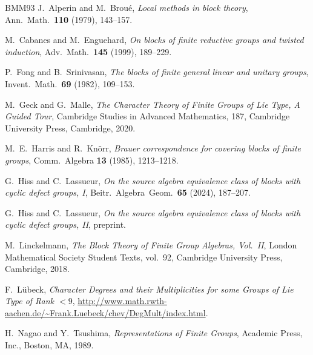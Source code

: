\documentclass[12pt]{amsart}
\theoremstyle{theorem}
\theoremstyle{definition}
\theoremstyle{remark}
\begin{document}
\begin{thebibliography}{BMM93}
 J.~Alperin and M.~Brou{\'e}, \emph{Local methods in 
        block theory}, Ann.\ Math.\ \textbf{110} (1979), 143--157.

 M.~Cabanes and M.~Enguehard, \emph{On blocks of finite 
        reductive groups and twisted induction}, Adv.\ Math.\ \textbf{145} 
        (1999), 189--229. 

 P.~Fong and B.~Srinivasan, \emph{The blocks of finite 
        general linear and unitary groups}, Invent.\ Math.\ \textbf{69} 
        (1982), 109--153.

 M.~Geck and G.~Malle, \emph{The Character Theory of 
        Finite Groups of Lie Type, A Guided Tour}, Cambridge Studies in Advanced
        Mathematics, 187, Cambridge University Press, Cambridge, 2020.

 M.~E.~Harris and R.~Kn{\"o}rr, \emph{Brauer correspondence 
        for covering blocks of finite groups}, Comm.\ Algebra \textbf{13} (1985), 
	1213--1218.

 G.~Hiss and C.~Lassueur, \emph{On the source algebra 
        equivalence class of blocks with cyclic defect groups, I}, 
        Beitr.\ Algebra\ Geom.\ \textbf{65} (2024), 187--207.

 G.~Hiss and C.~Lassueur, \emph{On the source algebra 
        equivalence class of blocks with cyclic defect groups, II}, preprint.

 M.~Linckelmann, \emph{The Block Theory of Finite 
        Group Algebras, {V}ol.~{II}}, London Mathematical Society Student Texts, 
        vol.~92, Cambridge University Press, Cambridge, 2018.   

 F.~L{\"u}beck, \emph{Character Degrees and their 
        Multiplicities for some Groups of Lie Type of Rank $< 9$},
        \url{http://www.math.rwth-aachen.de/~Frank.Luebeck/chev/DegMult/index.html}.

 H.~Nagao and Y.~Tsushima, \emph{Representations of Finite
        Groups}, Academic Press, Inc., Boston, MA, 1989.
\end{thebibliography}
\end{document}
